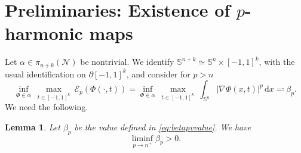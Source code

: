 \documentclass[12pt]{amsart}
\newcommand{\dif}{\,\mathrm{d}}
\def\S{{\mathbb S}}
\newtheorem{lemma}[theorem]{Lemma}
\newcommand{\dx}{\dif x}
\numberwithin{theorem}{section} \numberwithin{equation}{section}
\newcommand{\mfdN}{\mathcal{N}}
\begin{document}
\section{Preliminaries: Existence of \texorpdfstring{$p$}{p}-harmonic maps}\label{s:prelim}
Let $\alpha \in \pi_{n+k}(\mfdN)$ be nontrivial. We identify $\S^{n+k} \simeq \S^n \times [-1,1]^k$, with the usual identification on $\partial[-1,1]^k$, and consider for $p > n$
\begin{equation}\label{eq:betapvvalue}
 \inf_{\Phi \in \alpha}\ \max_{t \in [-1,1]^k}\ \mathcal{E}_p(\Phi(\cdot,t))=\inf_{\Phi \in \alpha}\ \max_{t \in [-1,1]^k}\ \int_{\S^n} |\nabla \Phi(x,t)|^p  \dx\eqqcolon \beta_p.
\end{equation}
We need the following.
\begin{lemma}\label{la:minimalbeta}
Let $\beta_p$ be the value defined in \eqref{eq:betapvvalue}. We have
\[\liminf_{p \to n^+} \beta_p > 0. \]
\end{lemma}
\end{document}
